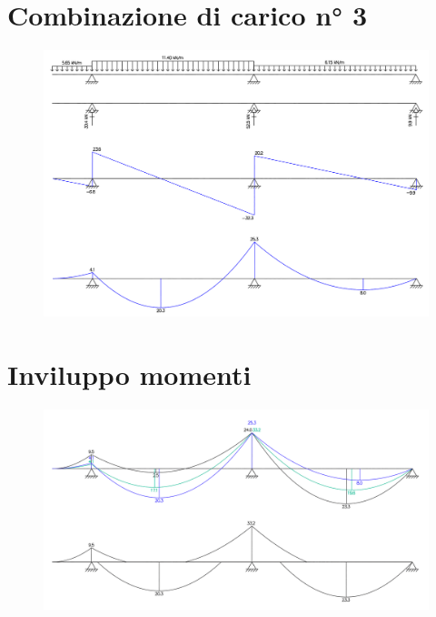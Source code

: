 \documentclass[a4paper,12pt, oneside]{book}
\begin{document}
    \break
    
    \section{Combinazione di carico n° 3}

    \begin{figure}[H]
    	\hspace*{-3.cm}\includegraphics[width=1.4\linewidth]{"immagini/caso 3.png"}
    \end{figure}

    \section{Inviluppo momenti}

    \begin{figure}[H]
    	\hspace*{-2.97cm}\includegraphics[width=1.4\linewidth]{"immagini/inviluppo momenti.png"}
    \end{figure}
    
\end{document}
